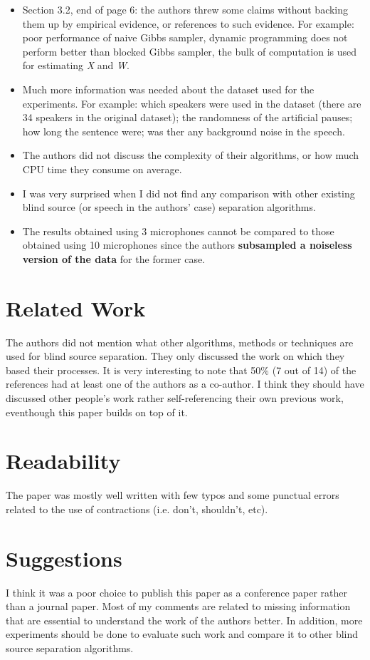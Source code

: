 \documentclass[10pt,a4paper]{article}
\begin{document}
\begin{itemize}
 \item Section 3.2, end of page 6: the authors threw some claims without backing them up by empirical evidence, or references to such evidence. For example:
poor performance of naive Gibbs sampler, dynamic programming does not perform better than blocked Gibbs sampler, the bulk of computation is used for estimating
 \textit{X} and \textit{W}.
 \item Much more information was needed about the dataset used for the experiments. For example: which speakers were used in the dataset (there are 34 speakers
in the original dataset); the randomness of the artificial pauses; how long the sentence were; was ther any background noise in the speech.
 \item The authors did not discuss the complexity of their algorithms, or how much CPU time they consume on average.
 \item I was very surprised when I did not find any comparison with other existing blind source (or speech in the authors' case) separation algorithms.
 \item The results obtained using 3 microphones cannot be compared to those obtained using 10 microphones since the authors \textbf{subsampled a noiseless
version of the data} for the former case.
\end{itemize}

\section{Related Work}
The authors did not mention what other algorithms, methods or techniques are used for blind source separation. They only discussed the work on which they based
their processes. It is very interesting to note that 50\% (7 out of 14) of the references had at least one of the authors as a co-author. I think they should
have discussed other people's work rather self-referencing their own previous work, eventhough this paper builds on top of it.

\section{Readability}
The paper was mostly well written with few typos and some punctual errors related to the use of contractions (i.e. don't, shouldn't, etc).

\section{Suggestions}
I think it was a poor choice to publish this paper as a conference paper rather than a journal paper. Most of my comments are related to missing information
that are essential to understand the work of the authors better. In addition, more experiments should be done to evaluate such work and compare it to other
blind source separation algorithms.
\end{document}

